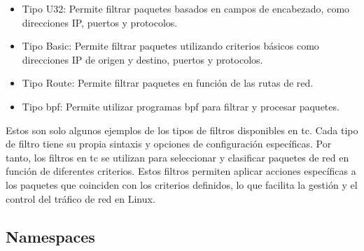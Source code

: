 \begin{itemize}
    \item Tipo U32: Permite filtrar paquetes basados en campos de encabezado, como direcciones IP, puertos y protocolos.
    \item Tipo Basic: Permite filtrar paquetes utilizando criterios básicos como direcciones IP de origen y destino, puertos y protocolos.
    \item Tipo Route: Permite filtrar paquetes en función de las rutas de red.
    \item Tipo \gls{bpf}: Permite utilizar programas \gls{bpf} para filtrar y procesar paquetes.
\end{itemize}

Estos son solo algunos ejemplos de los tipos de filtros disponibles en \gls{tc}. Cada tipo de filtro tiene su propia sintaxis y opciones de configuración específicas. Por tanto, los filtros en \gls{tc} se utilizan para seleccionar y clasificar paquetes de red en función de diferentes criterios. Estos filtros permiten aplicar acciones específicas a los paquetes que coinciden con los criterios definidos, lo que facilita la gestión y el control del tráfico de red en Linux.



\subsection{Namespaces}
\label{namespaces}

